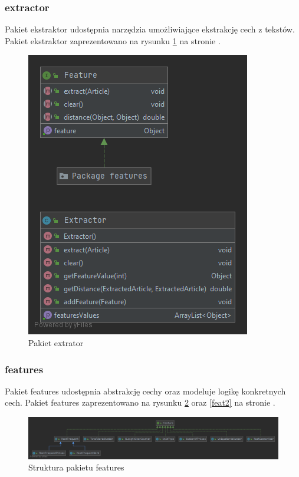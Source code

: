 \documentclass{classrep}
\begin{document}
\subsubsection{extractor}
Pakiet ekstraktor udostępnia narzędzia umożliwiające ekstrakcję cech z tekstów. Pakiet ekstraktor zaprezentowano na rysunku \ref{extr} na stronie \pageref{extr}.
\begin{figure}[H]
\label{extr}
\includegraphics[scale=0.5]{Package extractor}
\caption{Pakiet extrator}
\end{figure}


\subsubsection{features}
Pakiet features udostępnia abstrakcję cechy oraz modeluje logikę konkretnych cech. Pakiet features zaprezentowano na rysunku \ref{feat} oraz \ref{feat2} na stronie \pageref{feat}.
\begin{figure}[H]
\label{feat}
\includegraphics[scale=0.20]{Features structure}
\caption{Struktura pakietu features}
\end{figure}
\end{document}
